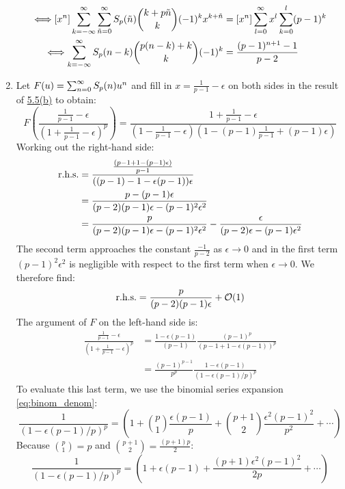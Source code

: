 \begin{solution}
\begin{enumerate}[label=(\alph*)]
\begin{align*}
            \Longleftrightarrow \coeff{x^n} \infsum[k] \bsum[\tilde{n}] S_p(\tilde{n}) \binom{k+p\tilde{n}}{k} (-1)^k x^{k + \tilde{n}} &= \coeff{x^n} \bsum[l]x^l \sum_{k=0}^l (p-1)^k\\
            \Longleftrightarrow \infsum[k] S_p(n-k)\binom{p(n-k) + k}{k}(-1)^k &= \frac{(p-1)^{n+1} - 1}{p-2}
        \end{align*}
        \item \hypertarget{eq:ch5:5:d}{} Let $F(u) = \bsum[n]S_p(n)u^n$ and fill in $x=\frac{1}{p-1}-\epsilon$ on both sides in the result of \hyperlink{eq:ch5:5:b}{5.5(b)} to obtain:
        \[
            F\left(\frac{\frac{1}{p-1}-\epsilon}{\left(1+\frac{1}{p-1}-\epsilon\right)^p}\right) = \frac{1+\frac{1}{p-1}-\epsilon}{\left(1-\frac{1}{p-1}-\epsilon\right)\left(1-(p-1)\frac{1}{p-1} + (p-1)\epsilon\right)}
        \]
        Working out the right-hand side:
        \begin{align*}
            \textnormal{r.h.s.} &= \frac{\frac{(p-1 + 1 - (p-1)\epsilon)}{p-1}}{((p-1) - 1 - \epsilon(p-1)) \epsilon} \\
            &= \frac{p - (p-1)\epsilon}{(p-2)(p-1)\epsilon - (p-1)^2\epsilon^2} \\
            &= \frac{p}{(p-2)(p-1)\epsilon - (p-1)^2\epsilon^2} - \frac{\epsilon}{(p-2)\epsilon - (p-1)\epsilon^2}
        \end{align*}
        The second term approaches the constant $\frac{-1}{p-2}$ as $\epsilon \to 0$ and in the first term $(p-1)^2\epsilon^2$ is negligible with respect to the first term when $\epsilon \to 0$. We therefore find:
        \[
            \textnormal{r.h.s.} = \frac{p}{(p-2)(p-1)\epsilon} + \mathcal{O}(1)
        \]
        The argument of $F$ on the left-hand side is:
        \begin{align*}
            \frac{\frac{1}{p-1}-\epsilon}{\left(1+\frac{1}{p-1}-\epsilon\right)^p} &= \frac{1-\epsilon(p-1)}{(p-1)} \frac{(p-1)^p}{(p-1 + 1 - \epsilon(p-1))^p} \\
            &= \frac{(p-1)^{p-1}}{p^p} \frac{1-\epsilon(p-1)}{(1-\epsilon(p-1)/p)^p}
        \end{align*}
        To evaluate this last term, we use the binomial series expansion \eqref{eq:binom_denom}:
        \[
            \frac{1}{(1-\epsilon(p-1)/p)^p} = \left(1 + \binom{p}{1}\frac{\epsilon(p-1)}{p}+ \binom{p+1}{2}\frac{\epsilon^2(p-1)^2}{p^2}+\cdots\right)
        \]
        Because $\binom{p}{1} = p$ and $\binom{p+1}{2} = \frac{(p+1)p}{2}$:
        \[
            \frac{1}{(1-\epsilon(p-1)/p)^p} = \left(1 + \epsilon(p-1)+\frac{(p+1)\epsilon^2(p-1)^2}{2p}+\cdots\right)
\]
\end{enumerate}
\end{solution}
